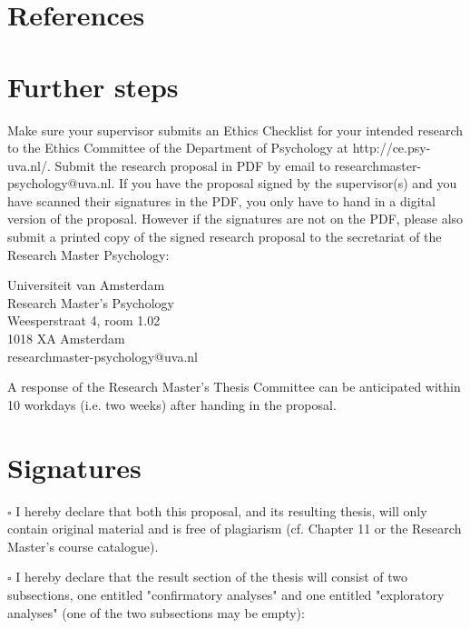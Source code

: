 \documentclass[12pt,a4paper]{article}\usepackage[]{graphicx}\usepackage[]{color}
\begin{document}
\noindent
\wordcount

\renewcommand{\bibsection}{} %
\section{References}


\section{Further steps}
Make sure your supervisor submits an Ethics Checklist for your intended research to the Ethics Committee of the Department of Psychology at http://ce.psy-uva.nl/. Submit the research proposal in PDF by email to researchmaster-psychology@uva.nl. 
If you have the proposal signed by the supervisor(s) and you have scanned their signatures in the PDF, you only have to hand in a digital version of the proposal. However if the signatures are not on the PDF, please also submit a printed copy of the signed research proposal to the secretariat of the Research Master Psychology:
\vspace{\baselineskip}

\noindent
Universiteit van Amsterdam \\
Research Master’s Psychology \\
Weesperstraat 4, room 1.02 \\
1018 XA Amsterdam \\
researchmaster-psychology@uva.nl
\vspace{\baselineskip}

\noindent
A response of the Research Master's Thesis Committee can be anticipated within 10 workdays (i.e. two weeks) after handing in the proposal. 

\section{Signatures}
$\square$ I hereby declare that both this proposal, and its resulting thesis, will only contain original material and is free of plagiarism (cf. Chapter 11 or the Research Master's course catalogue).
\vspace{\baselineskip}

\noindent
$\square$ I hereby declare that the result section of the thesis will consist of two subsections, one entitled "confirmatory analyses" and one entitled "exploratory analyses" (one of the two subsections may be empty):
\end{document}
